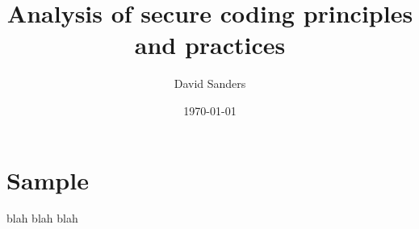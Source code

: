 \documentclass[12pt]{article}
\title{Analysis of secure coding principles and practices}
\author{David Sanders}
\date{\today}
\begin{document}
\makeuswtitlepage{}


\tableofcontents
\pagebreak


\section{Sample}
blah blah blah
\end{document}
